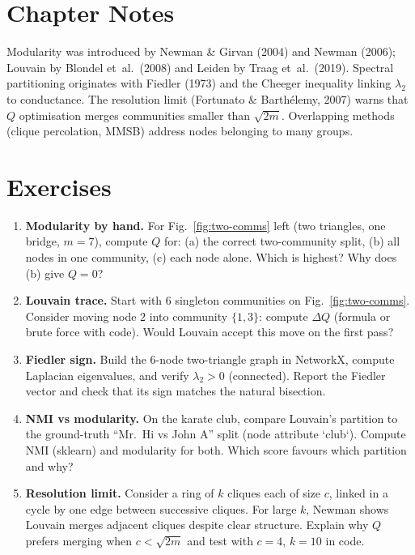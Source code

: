 \section{Chapter Notes}
Modularity was introduced by Newman \& Girvan (2004) and Newman (2006); Louvain by Blondel et~al.\ (2008) and Leiden by Traag et~al.\ (2019). Spectral partitioning originates with Fiedler (1973) and the Cheeger inequality linking $\lambda_2$ to conductance. The resolution limit (Fortunato \& Barth\'elemy, 2007) warns that $Q$ optimisation merges communities smaller than $\sqrt{2m}$. Overlapping methods (clique percolation, MMSB) address nodes belonging to many groups.

\section{Exercises}
\label{sec:ch03-exercises}
\begin{enumerate}[label=E3.\arabic*, leftmargin=*, itemsep=0.8em]
    \item \textbf{Modularity by hand.} For Fig.~\ref{fig:two-comms} left (two triangles, one bridge, $m=7$), compute $Q$ for: (a) the correct two-community split, (b) all nodes in one community, (c) each node alone. Which is highest? Why does (b) give $Q=0$?
    \item \textbf{Louvain trace.} Start with 6 singleton communities on Fig.~\ref{fig:two-comms}. Consider moving node $2$ into community $\{1,3\}$: compute $\Delta Q$ (formula or brute force with code). Would Louvain accept this move on the first pass?
    \item \textbf{Fiedler sign.} Build the 6-node two-triangle graph in NetworkX, compute Laplacian eigenvalues, and verify $\lambda_2>0$ (connected). Report the Fiedler vector and check that its sign matches the natural bisection.
    \item \textbf{NMI vs modularity.} On the karate club, compare Louvain's partition to the ground-truth ``Mr.~Hi vs John A'' split (node attribute `club`). Compute NMI (sklearn) and modularity for both. Which score favours which partition and why?
    \item \textbf{Resolution limit.} Consider a ring of $k$ cliques each of size $c$, linked in a cycle by one edge between successive cliques. For large $k$, Newman shows Louvain merges adjacent cliques despite clear structure. Explain why $Q$ prefers merging when $c<\sqrt{2m}$ and test with $c=4$, $k=10$ in code.
\end{enumerate}
